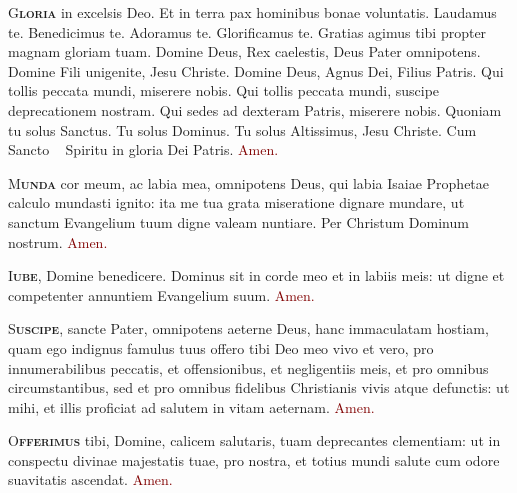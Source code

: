 \documentclass[12pt,a3paper, landscape]{scrartcl}
\newcommand{\krzyz}{\textcolor{red}{\raisebox{-1mm}{\scalebox{1.5}{\ding{64}}}}}
\newcommand{\amen}{\textcolor{Maroon}{Amen.}}
\newcommand{\initial}[2]{\lettrine[lines=3]{\color{Maroon}#1}{\bfseries\color{Maroon}#2}}
\newcommand{\gap}{\vspace*{0.1cm}}
\begin{document}
\thispagestyle{empty}

\pagecolor{fondpaille}
\color{darkgreen}
\large

\begin{center}

    \begin{minipage}[t]{0.28\linewidth}

        \vspace*{2.2cm}

        \initial{G}{loria} in excelsis Deo. Et in terra pax hominibus bonae
        voluntatis. Laudamus te. Benedicimus te. Adoramus te. Glorificamus te.
        Gratias agimus tibi propter magnam gloriam tuam. Domine Deus, Rex
        caelestis, Deus Pater omnipotens. Domine Fili unigenite, Jesu Christe.
        Domine Deus, Agnus Dei, Filius Patris. Qui tollis peccata mundi,
        miserere nobis. Qui tollis peccata mundi, suscipe deprecationem nostram.
        Qui sedes ad dexteram Patris, miserere nobis. Quoniam tu solus Sanctus.
        Tu solus Dominus. Tu solus Altissimus, Jesu Christe. Cum Sancto \krzyz~
        Spiritu in gloria Dei Patris. \amen

        \gap

        \initial{M}{unda} cor meum, ac labia mea, omnipotens Deus, qui labia
        Isaiae Prophetae calculo mundasti ignito: ita me tua grata miseratione
        dignare mundare, ut sanctum Evangelium tuum digne valeam nuntiare. Per
        Christum Dominum nostrum. \amen

        \gap

        \initial{I}{ube}, Domine benedicere. Dominus sit in corde meo et in
        labiis meis: ut digne et competenter annuntiem Evangelium suum. \amen

        \gap

        \initial{S}{uscipe}, sancte Pater, omnipotens aeterne Deus, hanc
        immaculatam hostiam, quam ego indignus famulus tuus offero tibi Deo meo
        vivo et vero, pro innumerabilibus peccatis, et offensionibus, et
        negligentiis meis, et pro omnibus circumstantibus, sed et pro omnibus
        fidelibus Christianis vivis atque defunctis: ut mihi, et illis proficiat
        ad salutem in vitam aeternam. \amen

        \gap

        \initial{O}{fferimus} tibi, Domine, calicem salutaris, tuam deprecantes
        clementiam: ut in conspectu divinae majestatis tuae, pro nostra, et
        totius mundi salute cum odore suavitatis ascendat. \amen


\end{minipage}
\end{center}
\end{document}
